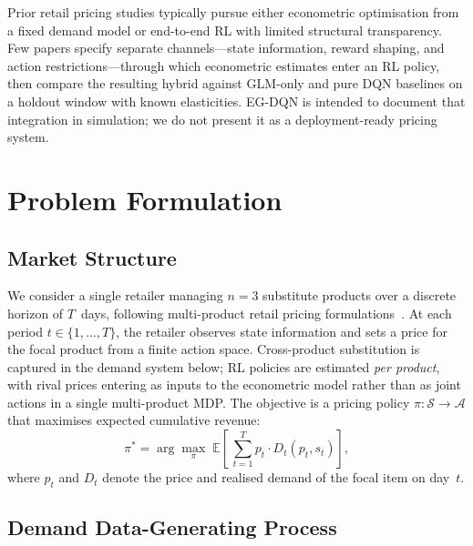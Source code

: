 \documentclass[journal, 10pt, twoside]{IEEEtran}
\begin{document}
Prior retail pricing studies typically pursue either econometric
optimisation from a fixed demand model or end-to-end RL with limited
structural transparency.
Few papers specify separate channels---state information, reward
shaping, and action restrictions---through which econometric estimates
enter an RL policy, then compare the resulting hybrid against GLM-only
and pure DQN baselines on a holdout window with known elasticities.
EG-DQN is intended to document that integration in simulation; we do
not present it as a deployment-ready pricing system.

\section{Problem Formulation}
\label{sec:problem}

\subsection{Market Structure}

We consider a single retailer managing $n=3$ substitute products over a
discrete horizon of $T$~days, following multi-product retail pricing
formulations~\cite{rios2023}.
At each period $t \in \{1,\ldots,T\}$, the retailer observes state
information and sets a price for the focal product from a finite action
space.
Cross-product substitution is captured in the demand system below; RL
policies are estimated \emph{per product}, with rival prices entering
as inputs to the econometric model rather than as joint actions in a
single multi-product MDP.
The objective is a pricing policy $\pi : \mathcal{S} \to \mathcal{A}$
that maximises expected cumulative revenue:
\begin{equation}
  \pi^* = \arg\max_{\pi}\;
  \mathbb{E}\!\left[\,\sum_{t=1}^{T} p_{t} \cdot
  D_t(p_t, s_t)\right],
  \label{eq:objective}
\end{equation}
where $p_t$ and $D_t$ denote the price and realised demand of the focal
item on day~$t$.

\subsection{Demand Data-Generating Process}
\end{document}
